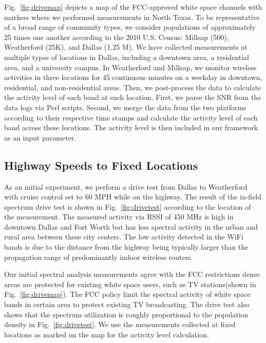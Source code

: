 Fig.~\ref{fig:drivemap} depicts a map of the FCC-approved white space channels with markers where we performed 
measurements in North Texas. To be representative of a broad range of community types, we consider populations of 
approximately 25 times one another according to the 2010 U.S. Census: Millsap (500), Weatherford (25K), and Dallas 
(1.25 M). We have collected measurements at multiple types of locations in Dallas, including a downtown area,
a residential area, and a university campus. In Weatherford and Millsap, we monitor wireless activities in three 
locations for 45 continuous minutes on a weekday in downtown, residential, and non-residential areas. Then, we 
post-process the data to calculate the activity level of each band at each location. First, we parse the SNR from 
the data logs via Perl scripts. Second, we merge the data from the two platforms according to their respective 
time stamps and calculate the activity level of each band across these locations. The activity level is then 
included in our framework as an input parameter. 

\subsection{Highway Speeds to Fixed Locations} 
\label{subsec:measurementresult}
As an initial experiment, we perform a drive test from Dallas to Weatherford with cruise control set to 60 MPH while 
on the highway. The result of the in-field spectrum drive test is shown in Fig.~\ref{fig:drivetest} according to 
the location of the measurement. The measured activity via RSSI of 450 MHz is high in downtown Dallas and 
Fort Worth but has less spectral activity in the urban and rural area between these city centers. The low activity 
detected in the WiFi bands is due to the distance from the highway being typically larger than the propagation range 
of predominantly indoor wireless routers.

Our initial spectral analysis measurements agree with the FCC restrictions dense areas are protected 
for existing white space users, such as TV stations(shown in Fig.~\ref{fig:drivemap}). The FCC policy limit the spectral activity of 
white space bands in certain area to protect existing TV broadcasting.
The drive test also shows that the spectrum 
utilization is roughly proportional to the population density in Fig.~\ref{fig:drivetest}. 
We use the measurements collected at fixed locations as marked on the map for the activity level calculation. 

